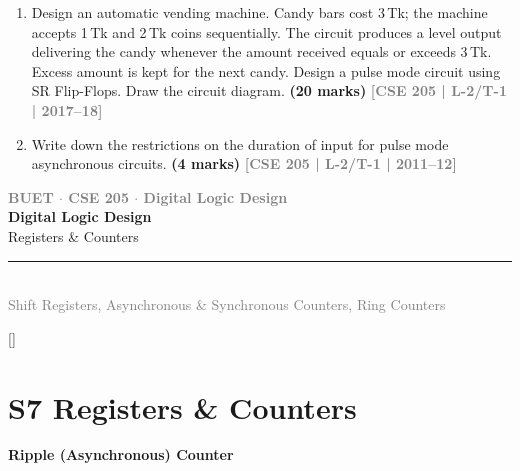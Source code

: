 \documentclass[12pt,a3paper]{article}
\newcommand{\yr}[1]{\hfill\textcolor{gray}{\small\textbf{[#1]}}}
\newcommand{\mk}[1]{\textcolor{orange!70!black}{\small\textbf{(#1 marks)}}}
\newcommand{\subtopic}[2]{%
  \vspace{10pt}
  \noindent\begin{tcolorbox}[colback=#1!8,colframe=#1,boxrule=0.6pt,arc=4pt,
    left=6pt,right=6pt,top=4pt,bottom=4pt]
    \small\bfseries\textcolor{#1}{#2}
  \end{tcolorbox}
  \vspace{2pt}
}
\newcommand{\secdivider}[4]{%
  \newpage\thispagestyle{empty}%
  \vspace*{\fill}%
  \begin{tcolorbox}[enhanced,colback=#4!7,colframe=#3,boxrule=1.5pt,arc=8pt,
    left=20pt,right=20pt,top=22pt,bottom=22pt,
    shadow={3pt}{-3pt}{0pt}{black!15}]
    \centering
    {\large\textcolor{gray}{\textbf{BUET $\cdot$ CSE 205 $\cdot$ Digital Logic Design}}}\\[8pt]
    {\fontsize{26}{32}\selectfont\bfseries\textcolor{#3}{Digital Logic Design}}\\[6pt]
    {\fontsize{15}{19}\selectfont\textcolor{dgray}{#1}}\\[12pt]
    \textcolor{#3!60}{\rule{0.5\textwidth}{0.5pt}}\\[6pt]
    {\small\textcolor{gray}{#2}}
  \end{tcolorbox}%
  \vspace*{\fill}\newpage%
}
\begin{document}
\begin{enumerate}
\item Design an automatic vending machine. Candy bars cost 3\,Tk; the machine accepts 1\,Tk and 2\,Tk coins sequentially. The circuit produces a level output delivering the candy whenever the amount received equals or exceeds 3\,Tk. Excess amount is kept for the next candy. Design a pulse mode circuit using SR Flip-Flops. Draw the circuit diagram.
\mk{20} \yr{CSE 205 | L-2/T-1 | 2017--18}

\item Write down the restrictions on the duration of input for pulse mode asynchronous circuits.
\mk{4} \yr{CSE 205 | L-2/T-1 | 2011--12}


\end{enumerate}


\secdivider{Registers \& Counters}{Shift Registers, Asynchronous \& Synchronous Counters, Ring Counters}{cG}{pink!60!red}

\label{sec:S7}
\titleformat{\section}{\large\bfseries\color{cG}}{}{0em}{}[\titlerule]
\section*{S7 \quad Registers \& Counters}

\subtopic{cG}{Ripple (Asynchronous) Counter}
\label{sub:s7-ripple}
\end{document}
